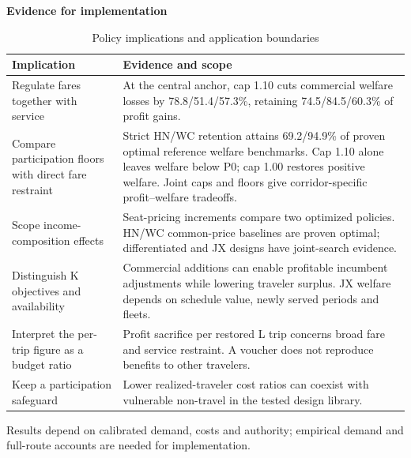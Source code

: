 \begin{table}[htbp]\centering
\caption{Policy implications and application boundaries}\label{tab:key_findings}
\begin{minipage}{.95\textwidth}\fontsize{8}{10}\selectfont{}\setlength{\tabcolsep}{2pt}\renewcommand{\arraystretch}{1.08}
\par\noindent\textbf{Evidence for implementation}\par\smallskip
\begin{tabular*}{\linewidth}{@{\extracolsep{\fill}}>{\raggedright\arraybackslash}p{.32\linewidth}>{\raggedright\arraybackslash}p{.62\linewidth}@{}}\toprule
Implication & Evidence and scope \\
\midrule
Regulate fares together with service & At the central anchor, cap 1.10 cuts commercial welfare losses by 78.8/51.4/57.3\%, retaining 74.5/84.5/60.3\% of profit gains. \\
Compare participation floors with direct fare restraint & Strict HN/WC retention attains 69.2/94.9\% of proven optimal reference welfare benchmarks. Cap 1.10 alone leaves welfare below P0; cap 1.00 restores positive welfare. Joint caps and floors give corridor-specific profit--welfare tradeoffs. \\
Scope income-composition effects & Seat-pricing increments compare two optimized policies. HN/WC common-price baselines are proven optimal; differentiated and JX designs have joint-search evidence. \\
Distinguish K objectives and availability & Commercial additions can enable profitable incumbent adjustments while lowering traveler surplus. JX welfare depends on schedule value, newly served periods and fleets. \\
Interpret the per-trip figure as a budget ratio & Profit sacrifice per restored L trip concerns broad fare and service restraint. A voucher does not reproduce benefits to other travelers. \\
Keep a participation safeguard & Lower realized-traveler cost ratios can coexist with vulnerable non-travel in the tested design library. \\
\bottomrule\end{tabular*}\par\medskip
\par\noindent\fontsize{8}{9.5}\selectfont Results depend on calibrated demand, costs and authority; empirical demand and full-route accounts are needed for implementation.
\end{minipage}\end{table}

